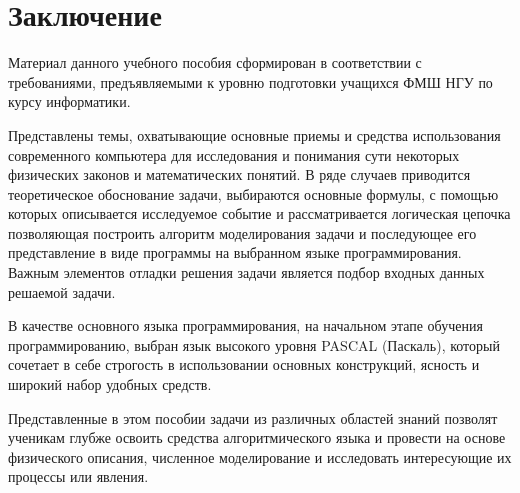 \section{Заключение}

Материал данного учебного пособия сформирован в соответствии с требованиями, предъявляемыми к уровню подготовки учащихся ФМШ НГУ по курсу информатики. 

Представлены темы, охватывающие основные приемы и средства использования современного компьютера для исследования и понимания сути некоторых физических законов и математических понятий. В ряде случаев приводится теоретическое обоснование задачи, выбираются основные формулы, с помощью которых описывается исследуемое событие и рассматривается логическая цепочка позволяющая построить алгоритм моделирования задачи и последующее его представление в виде программы на выбранном языке программирования. Важным элементов отладки решения задачи является подбор входных данных решаемой задачи.

В качестве основного языка программирования, на начальном этапе обучения  программированию,  выбран  язык высокого уровня PASCAL (Паскаль), который сочетает в   себе строгость в использовании основных конструкций, ясность и широкий набор удобных средств.

Представленные в этом пособии задачи из различных областей знаний позволят ученикам глубже освоить средства алгоритмического языка и провести на основе физического описания, численное моделирование и исследовать интересующие их процессы или явления. 



